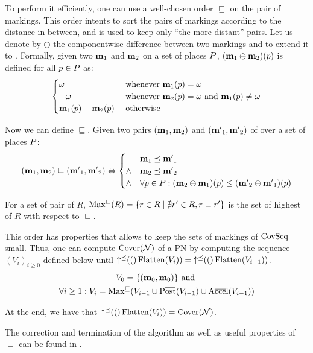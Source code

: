 To perform it efficiently, one can use a well-chosen order $\sqsubseteq$ on the pair of markings.
This order intents to sort the pairs of markings according to the distance in between, and is used to keep only ``the more distant'' pairs.
Let us denote by $\ominus$ the componentwise difference between two markings and to extend it to \omarks.
Formally, given two \omarks $\mathbf{m}_1$ and $\mathbf{m}_2$ on a set of places $P$, $(\mathbf{m}_1 \ominus \mathbf{m}_2)(p)$ is defined for all $p \in P$ as:
\[
  \begin{cases}
    \omega & \text{ whenever } \mathbf{m}_1(p) = \omega \\
    -\omega & \text{ whenever } \mathbf{m}_2(p) = \omega \text{ and } \mathbf{m}_1(p) \neq \omega \\
    \mathbf{m}_1(p) - \mathbf{m}_2(p) & \text{ otherwise}
  \end{cases}
\]

Now we can define $\sqsubseteq$.
Given two pairs $(\mathbf{m}_1, \mathbf{m}_2)$ and $(\mathbf{m'}_1, \mathbf{m'}_2)$ of \omarks over a set of places $P$:
\[
  (\mathbf{m}_1, \mathbf{m}_2) \sqsubseteq (\mathbf{m'}_1, \mathbf{m'}_2) \Leftrightarrow
  \begin{cases}
    & \mathbf{m}_1 \preceq \mathbf{m'}_1 \\
    \wedge & \mathbf{m}_2 \preceq \mathbf{m'}_2 \\
    \wedge & \forall p \in P : (\mathbf{m}_2 \ominus \mathbf{m}_1)(p) \leq (\mathbf{m'}_2 \ominus \mathbf{m'}_1)(p)
  \end{cases}
\]

For a set of pair of \omarks $R$, $\operatorname{Max^\sqsubseteq}(R) = \{ r \in R \mid \nexists r' \in R, r \sqsubseteq r'\}$ is the set of highest \omark of $R$ with respect to $\sqsubseteq$.

This order has properties \citep{Geeraerts07} that allows to keep the sets of markings of $\operatorname{CovSeq}$ small.
Thus, one can compute $\operatorname{Cover}(\mathcal{N})$ of a \ac{PN} \NPTm by computing the sequence $(V_i)_{i \geq 0}$ defined below until $\operatorname{\uparrow^\preceq}(()\operatorname{Flatten}(V_i)) = \operatorname{\uparrow^\preceq}(()\operatorname{Flatten}(V_{i-1}))$.
\begin{gather*}
  V_0 = \{(\mari, \mari)\} \text{ and } \\
  \forall i \geq 1 : V_i = \Maxs(V_{i-1} \cup \Postb(V_{i-1}) \cup \Accelb(V_{i-1}))
\end{gather*}

At the end, we have that $\operatorname{\uparrow^\preceq}(()\operatorname{Flatten}(V_i)) = \operatorname{Cover}(\mathcal{N})$.

The correction and termination of the algorithm as well as useful properties of $\sqsubseteq$ can be found in \cite{Geeraerts07, Ganty09}.

